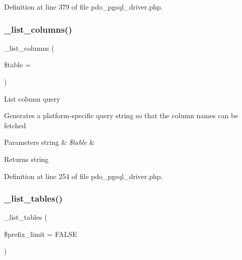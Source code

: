 Definition at line 379 of file pdo\+\_\+pgsql\+\_\+driver.\+php.

\mbox{\label{class_c_i___d_b__pdo__pgsql__driver_a7ccb7f9c301fe7f0a9db701254142b63}} 
\subsubsection{\texorpdfstring{\_list\_columns()}{\_list\_columns()}}
{\footnotesize\ttfamily \+\_\+list\+\_\+columns (\begin{DoxyParamCaption}\item[{}]{\$table = {\ttfamily \textquotesingle{}\textquotesingle{}} }\end{DoxyParamCaption})\hspace{0.3cm}{\ttfamily [protected]}}

List column query

Generates a platform-\/specific query string so that the column names can be fetched


\begin{DoxyParams}[1]{Parameters}
string & {\em \$table} & \\
\hline
\end{DoxyParams}
\begin{DoxyReturn}{Returns}
string 
\end{DoxyReturn}


Definition at line 254 of file pdo\+\_\+pgsql\+\_\+driver.\+php.

\mbox{\label{class_c_i___d_b__pdo__pgsql__driver_a435c0f3ce54fe7daa178baa8532ebd54}} 
\subsubsection{\texorpdfstring{\_list\_tables()}{\_list\_tables()}}
{\footnotesize\ttfamily \+\_\+list\+\_\+tables (\begin{DoxyParamCaption}\item[{}]{\$prefix\+\_\+limit = {\ttfamily FALSE} }\end{DoxyParamCaption})\hspace{0.3cm}{\ttfamily [protected]}}

